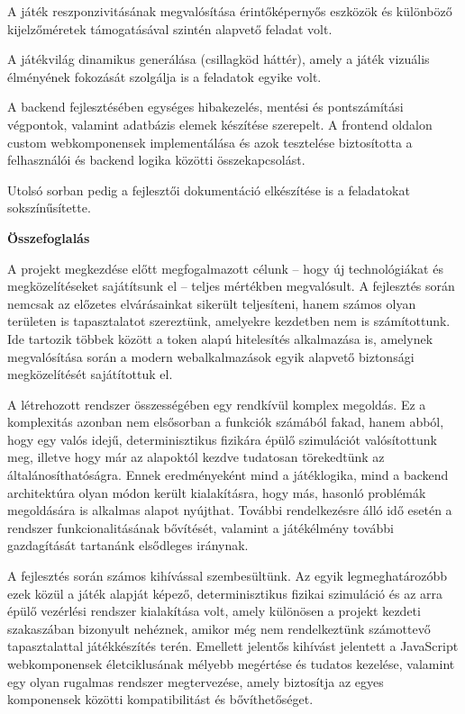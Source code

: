 \documentclass[12pt]{report}
\newcommand{\fullpagetitle}[1]{%
    \clearpage
    \thispagestyle{empty}
    \vspace*{\fill}
    \begin{center}
        {\Huge\bfseries #1\par}
    \end{center}
    \vspace*{\fill}
    \clearpage
    \setcounter{section}{0}
}
\begin{document}
A játék reszponzivitásának megvalósítása érintőképernyős eszközök és különböző kijelzőméretek támogatásával szintén alapvető feladat volt.

A játékvilág dinamikus generálása (csillagköd háttér), amely a játék vizuális élményének fokozását szolgálja is a feladatok egyike volt.

A backend fejlesztésében egységes hibakezelés, mentési és pontszámítási végpontok, valamint adatbázis elemek készítése szerepelt. A frontend oldalon custom webkomponensek implementálása és azok tesztelése biztosította a felhasználói és backend logika közötti összekapcsolást.

Utolsó sorban pedig a fejlesztői dokumentáció elkészítése is a feladatokat sokszínűsítette.

\fullpagetitle{Összefoglalás}

\newpage
\markboth{}{}

A projekt megkezdése előtt megfogalmazott célunk – hogy új technológiákat és megközelítéseket sajátítsunk el – teljes mértékben megvalósult. A fejlesztés során nemcsak az előzetes elvárásainkat sikerült teljesíteni, hanem számos olyan területen is tapasztalatot szereztünk, amelyekre kezdetben nem is számítottunk. Ide tartozik többek között a token alapú hitelesítés alkalmazása is, amelynek megvalósítása során a modern webalkalmazások egyik alapvető biztonsági megközelítését sajátítottuk el.

A létrehozott rendszer összességében egy rendkívül komplex megoldás. Ez a komplexitás azonban nem elsősorban a funkciók számából fakad, hanem abból, hogy egy valós idejű, determinisztikus fizikára épülő szimulációt valósítottunk meg, illetve hogy már az alapoktól kezdve tudatosan törekedtünk az általánosíthatóságra. Ennek eredményeként mind a játéklogika, mind a backend architektúra olyan módon került kialakításra, hogy más, hasonló problémák megoldására is alkalmas alapot nyújthat. További rendelkezésre álló idő esetén a rendszer funkcionalitásának bővítését, valamint a játékélmény további gazdagítását tartanánk elsődleges iránynak.

A fejlesztés során számos kihívással szembesültünk. Az egyik legmeghatározóbb ezek közül a játék alapját képező, determinisztikus fizikai szimuláció és az arra épülő vezérlési rendszer kialakítása volt, amely különösen a projekt kezdeti szakaszában bizonyult nehéznek, amikor még nem rendelkeztünk számottevő tapasztalattal játékkészítés terén. Emellett jelentős kihívást jelentett a JavaScript webkomponensek életciklusának mélyebb megértése és tudatos kezelése, valamint egy olyan rugalmas rendszer megtervezése, amely biztosítja az egyes komponensek közötti kompatibilitást és bővíthetőséget.
\end{document}
